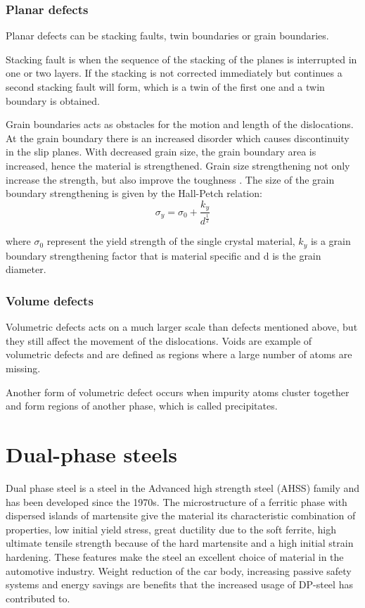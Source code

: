 \documentclass{article}
\begin{document}
\subsubsection{Planar defects}
Planar defects can be stacking faults, twin boundaries or grain boundaries. 

Stacking fault is when the sequence of the stacking of the planes is interrupted in one or two layers. If the stacking is not corrected immediately but continues a second stacking fault will form, which is a twin of the first one and a twin boundary is obtained. 

Grain boundaries acts as obstacles for the motion and length of the dislocations. 
At the grain boundary there is an increased disorder which causes discontinuity in the slip planes. With decreased grain size, the grain boundary area is increased, hence the material is strengthened. Grain size strengthening not only increase the strength, but also improve the toughness \cite{Metalseng}. The size of the grain boundary strengthening is given by the Hall-Petch relation:
\begin{equation}
    \sigma_y= \sigma_0 + \frac{k_y}{d^\frac{1}{2}}
    \label{Eq:Hall-Petch}
\end{equation}

where $\sigma_0$ represent the yield strength of the single crystal material, $k_y$ is a grain boundary strengthening factor that is material specific and d is the grain diameter. 

\subsubsection{Volume defects}
Volumetric defects acts on a much larger scale than defects mentioned above, but they still affect the movement of the dislocations. Voids are example of volumetric defects and are defined as regions where a large number of atoms are missing. 

Another form of volumetric defect occurs when impurity atoms cluster together and form regions of another phase, which is called precipitates.  

\section{Dual-phase steels}
Dual phase steel is a steel in the Advanced high strength steel (AHSS) family and has been developed since the 1970s. The microstructure of a ferritic phase with dispersed islands of martensite give the material its characteristic combination of properties, low initial yield stress, great ductility due to the soft ferrite, high ultimate tensile strength because of the hard martensite and a high initial strain hardening. These features make the steel an excellent choice of material in the automotive industry. Weight reduction of the car body, increasing passive safety systems and energy savings are benefits that the increased usage of DP-steel has contributed to. 
\end{document}
